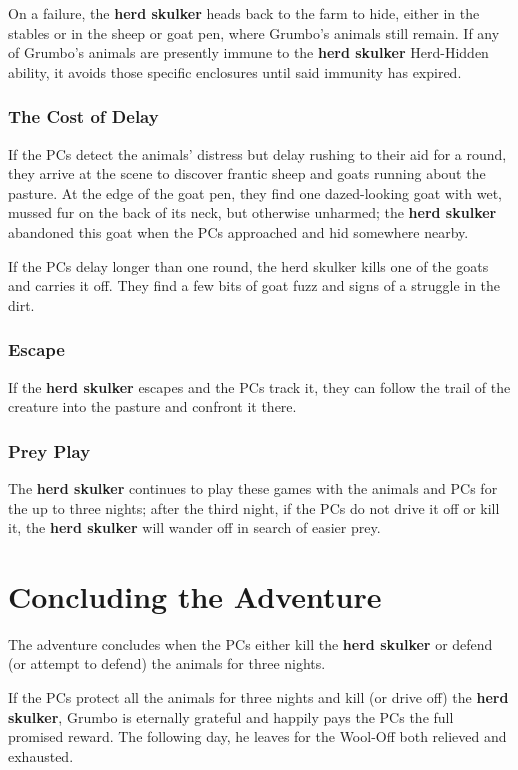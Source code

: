 \documentclass[10pt,a4paper,twoside,bg=print,twocolumn,openany,nodeprecatedcode]{dndbook}
\begin{document}
On a failure, the \textbf{herd skulker} heads back to the farm to hide, either in the stables or in the sheep or goat pen, where Grumbo's animals still remain. If any of Grumbo's animals are presently immune to the \textbf{herd skulker} Herd-Hidden ability, it avoids those specific enclosures until said immunity has expired.

\subsubsection{The Cost of Delay}
If the PCs detect the animals' distress but delay rushing to their aid for a round, they arrive at the scene to discover frantic sheep and goats running about the pasture. At the edge of the goat pen, they find one dazed-looking goat with wet, mussed fur on the back of its neck, but otherwise unharmed; the \textbf{herd skulker} abandoned this goat when the PCs approached and hid somewhere nearby.

If the PCs delay longer than one round, the herd skulker kills one of the goats and carries it off. They find a few bits of goat fuzz and signs of a struggle in the dirt.

\subsubsection{Escape}
If the \textbf{herd skulker} escapes and the PCs track it, they can follow the trail of the creature into the pasture and confront it there.

\subsubsection{Prey Play}
The \textbf{herd skulker} continues to play these games with the animals and PCs for the up to three nights; after the third night, if the PCs do not drive it off or kill it, the \textbf{herd skulker} will wander off in search of easier prey.

\section{Concluding the Adventure}
The adventure concludes when the PCs either kill the \textbf{herd skulker} or defend (or attempt to defend) the animals for three nights.

If the PCs protect all the animals for three nights and kill (or drive off) the \textbf{herd skulker}, Grumbo is eternally grateful and happily pays the PCs the full promised reward. The following day, he leaves for the Wool-Off both relieved and exhausted.
\end{document}
